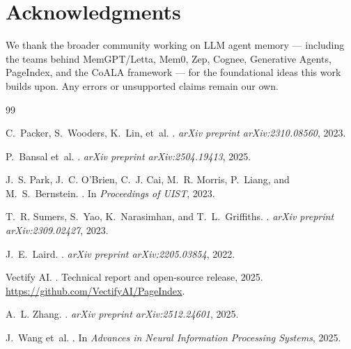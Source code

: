 \documentclass[11pt,a4paper]{article}
\theoremstyle{cortexprop}
\begin{document}
\section*{Acknowledgments}

We thank the broader community working on LLM agent memory --- including
the teams behind MemGPT/Letta, Mem0, Zep, Cognee, Generative Agents,
PageIndex, and the CoALA framework --- for the foundational ideas this
work builds upon. Any errors or unsupported claims remain our own.

\begin{thebibliography}{99}

C.~Packer, S.~Wooders, K.~Lin, et~al.
.
\newblock \textit{arXiv preprint arXiv:2310.08560}, 2023.

P.~Bansal et~al.
.
\newblock \textit{arXiv preprint arXiv:2504.19413}, 2025.

J.~S. Park, J.~C. O'Brien, C.~J. Cai, M.~R. Morris, P.~Liang, and
M.~S.~Bernstein.
.
\newblock In \textit{Proceedings of UIST}, 2023.

T.~R. Sumers, S.~Yao, K.~Narasimhan, and T.~L.~Griffiths.
.
\newblock \textit{arXiv preprint arXiv:2309.02427}, 2023.

J.~E.~Laird.
.
\newblock \textit{arXiv preprint arXiv:2205.03854}, 2022.

Vectify AI.
.
\newblock Technical report and open-source release, 2025.
\newblock \url{https://github.com/VectifyAI/PageIndex}.

A.~L. Zhang.
.
\newblock \textit{arXiv preprint arXiv:2512.24601}, 2025.

J.~Wang et~al.
.
\newblock In \textit{Advances in Neural Information Processing Systems},
2025.


\end{thebibliography}
\end{document}
